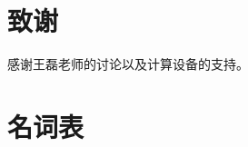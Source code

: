 \documentclass[A4,twoside,UTF8]{ctexart}
\begin{document}

\section*{致谢}

感谢王磊老师的讨论以及计算设备的支持。


\section*{名词表}
\end{document}
